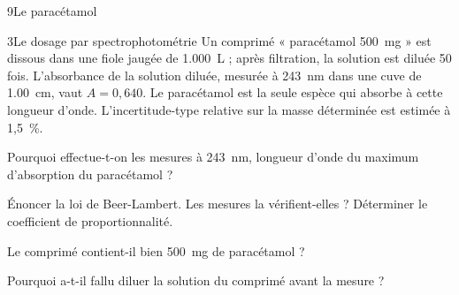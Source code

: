 \begin{exoBac}{9}{Le paracétamol}
\begin{docu}{3}{Le dosage par spectrophotométrie}
Un comprimé « paracétamol 500~mg » est dissous dans une fiole jaugée de \qty{1,000}{L} ; après filtration, la solution est
diluée 50 fois. L'absorbance de la solution diluée, mesurée à \qty{243}{nm} dans une cuve de \qty{1,00}{cm}, vaut $A=0{,}640$. Le
paracétamol est la seule espèce qui absorbe à cette longueur d'onde. L'incertitude-type relative sur la masse déterminée
est estimée à 1,5~\%.
\end{docu}
\begin{questions}[resume]
\item Pourquoi effectue-t-on les mesures à \qty{243}{nm}, longueur d'onde du maximum d'absorption du paracétamol ?
\item Énoncer la loi de Beer-Lambert. Les mesures la vérifient-elles ? Déterminer le coefficient de proportionnalité.
\item \initiative Le comprimé contient-il bien \qty{500}{mg} de paracétamol ?
\item Pourquoi a-t-il fallu diluer la solution du comprimé avant la mesure ?
\end{questions}
\end{exoBac}

